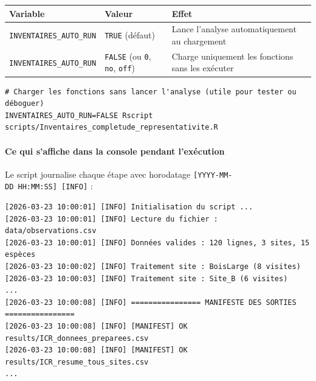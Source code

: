 {\def\LTcaptype{none} %
\begin{longtable}[]{@{}
  >{\raggedright\arraybackslash}p{}
  >{\raggedright\arraybackslash}p{}
  >{\raggedright\arraybackslash}p{}@{}}
\toprule\noalign{}
\begin{minipage}[b]{\linewidth}\raggedright
Variable
\end{minipage} & \begin{minipage}[b]{\linewidth}\raggedright
Valeur
\end{minipage} & \begin{minipage}[b]{\linewidth}\raggedright
Effet
\end{minipage} \\
\midrule\noalign{}
\endhead
\bottomrule\noalign{}
\endlastfoot
\texttt{INVENTAIRES\_AUTO\_RUN} & \texttt{TRUE} (défaut) & Lance
l'analyse automatiquement au chargement \\
\texttt{INVENTAIRES\_AUTO\_RUN} & \texttt{FALSE} (ou \texttt{0},
\texttt{no}, \texttt{off}) & Charge uniquement les fonctions sans les
exécuter \\
\end{longtable}
}

\begin{verbatim}
# Charger les fonctions sans lancer l'analyse (utile pour tester ou déboguer)
INVENTAIRES_AUTO_RUN=FALSE Rscript scripts/Inventaires_completude_representativite.R
\end{verbatim}

\paragraph{Ce qui s'affiche dans la console pendant
l'exécution}\label{ce-qui-saffiche-dans-la-console-pendant-lexuxe9cution}

Le script journalise chaque étape avec horodatage
\texttt{{[}YYYY-MM-DD\ HH:MM:SS{]}\ {[}INFO{]}} :

\begin{verbatim}
[2026-03-23 10:00:01] [INFO] Initialisation du script ...
[2026-03-23 10:00:01] [INFO] Lecture du fichier : data/observations.csv
[2026-03-23 10:00:01] [INFO] Données valides : 120 lignes, 3 sites, 15 espèces
[2026-03-23 10:00:02] [INFO] Traitement site : BoisLarge (8 visites)
[2026-03-23 10:00:03] [INFO] Traitement site : Site_B (6 visites)
...
[2026-03-23 10:00:08] [INFO] ================ MANIFESTE DES SORTIES ================
[2026-03-23 10:00:08] [INFO] [MANIFEST] OK   results/ICR_donnees_preparees.csv
[2026-03-23 10:00:08] [INFO] [MANIFEST] OK   results/ICR_resume_tous_sites.csv
...
\end{verbatim}

